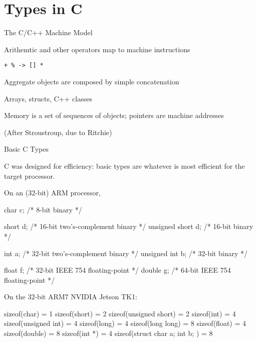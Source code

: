 \documentclass{plt}
\begin{document}
\part{Types in C}

\begin{frame}{The C/C++ Machine Model}

  Arithemtic and other operators map to machine instructions

  \texttt{+ \% -> [] *}

  \medskip

  Aggregate objects are composed by simple concatenation

  Arrays, structs, C++ classes

  \medskip

  Memory is a set of sequences of objects; pointers are machine addresses

{\tiny (After Stroustroup, due to Ritchie)}
\end{frame}

\begin{frame}[fragile]{Basic C Types}

C was designed for efficiency: basic types are whatever is most
efficient for the target processor.

On an (32-bit) ARM processor,

\begin{C}
char c;           /* 8-bit binary */

short d;          /* 16-bit two's-complement binary */
unsigned short d; /* 16-bit binary */

int a;            /* 32-bit two's-complement binary */
unsigned int b;   /* 32-bit binary */

float f;          /* 32-bit IEEE 754 floating-point */
double g;         /* 64-bit IEEE 754 floating-point */
\end{C}

\end{frame}

On the 32-bit ARM7 NVIDIA Jetson TK1:

sizeof(char) = 1
sizeof(short) = 2
sizeof(unsigned short) = 2
sizeof(int) = 4
sizeof(unsigned int) = 4
sizeof(long) = 4
sizeof(long long) = 8
sizeof(float) = 4
sizeof(double) = 8
sizeof(int *) = 4
sizeof(struct { char a; int b; }) = 8
\end{document}

